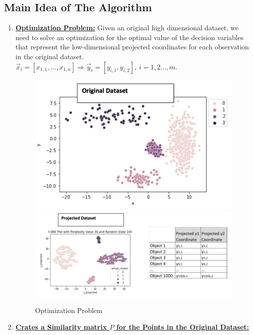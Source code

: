 \documentclass[11pt]{elegantbook}
\begin{document}
\subsection{Main Idea of The Algorithm}
\begin{enumerate}
    \item \textbf{\underline{Optimization Problem:}} Given an original high dimensional dataset, we need to solve an optimization for the optimal value of the decision variables that represent the low-dimensional projected coordinates for each observation in the original dataset.\\
    $\vec{x}_i=[x_{1,1},...,x_{1,n}] \Rightarrow \vec{y}_i=[y_{i,1},y_{i,2}],\ i=1,2...,m$.
    \begin{center}\begin{figure}[htbp]
        \centering
        \includegraphics[scale=0.4]{OP_tsne.png}
        \includegraphics[scale=0.4]{OP_tsne_2.png}
        \caption{Optimization Problem}
        \label{}
    \end{figure}\end{center}
    \item \textbf{\underline{Crates a Similarity matrix $P$ for the Points in the Original Dataset:}}

\end{enumerate}
\end{document}
